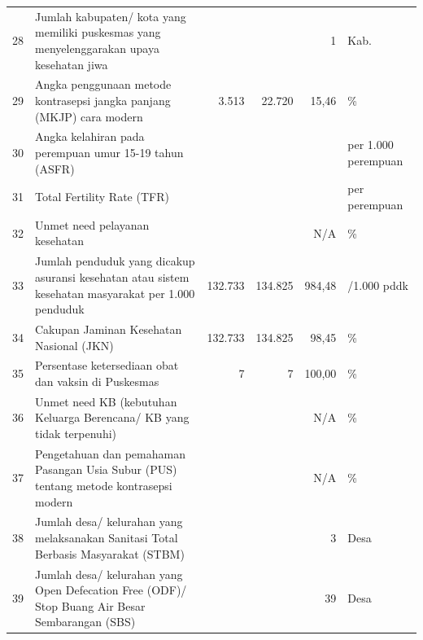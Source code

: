 \begin{center}
\begin{longtable}{rY{12em}rrrY{6em}}
                   28 & Jumlah kabupaten/ kota yang memiliki puskesmas yang menyelenggarakan upaya kesehatan jiwa                                      &         &         &      1 & Kab.                \\
                                     29 & Angka penggunaan metode kontrasepsi jangka panjang (MKJP) cara modern                                       					 &   3.513 &  22.720 &  15,46 & \%                  \\
                   30 & Angka kelahiran pada perempuan umur 15-19 tahun (ASFR)                                                                         &         &         &        & per 1.000 perempuan \\
                                     31 & Total Fertility Rate (TFR)                                                                                   					 &         &         &        & per perempuan       \\
                   32 & Unmet need pelayanan kesehatan                                                                                                 &         &         &    N/A & \%                  \\
                                     33 & Jumlah penduduk yang dicakup asuransi kesehatan atau sistem kesehatan masyarakat per 1.000 penduduk        					 & 132.733 & 134.825 & 984,48 & /1.000 pddk         \\
                   34 & Cakupan Jaminan Kesehatan Nasional (JKN)                                                                                       & 132.733 & 134.825 &  98,45 & \%                  \\
                                     35 & Persentase ketersediaan obat dan vaksin di Puskesmas                                                       					 &       7 &       7 & 100,00 & \%                  \\
                   36 & Unmet need KB (kebutuhan Keluarga Berencana/ KB yang tidak terpenuhi)                                                          &         &         &    N/A & \%                  \\
                                     37 & Pengetahuan dan pemahaman Pasangan Usia Subur (PUS) tentang metode kontrasepsi modern                       					 &         &         &    N/A & \%                  \\
                   38 & Jumlah desa/ kelurahan yang melaksanakan Sanitasi Total Berbasis Masyarakat (STBM)                                             &         &         &      3 & Desa                \\
                                     39 & Jumlah desa/ kelurahan yang Open Defecation Free (ODF)/ Stop Buang Air Besar Sembarangan (SBS)               					 &         &         &     39 & Desa                \\
\bottomrule
\end{longtable}
\par\end{center}